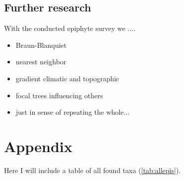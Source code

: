 \documentclass[12pt, a4paper, oneside, draft]{scrartcl}
\begin{document}
	\subsection{Further research}
	With the conducted epiphyte survey we ....
		\begin{itemize}
		\item Braun-Blanquiet
		\item nearest neighbor
		\item gradient climatic and topographic
		\item focal trees influencing others
		\item just in sense of repeating the whole...
		\end{itemize}

\newpage
\begin{multicols}{2}[\printbibheading]
	\sloppy
	\printbibliography[heading=none]
\end{multicols}
\newpage
\section*{Appendix}
	\setcounter{table}{0}
	\renewcommand{\thetable}{A-\arabic{table}}
	Here I will include a table of all found taxa (\autoref{tab:allepis}).\\	
	
%	
	
%	

\listoftodos

\end{document}
